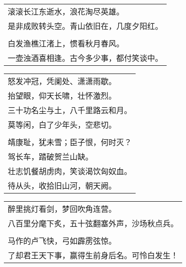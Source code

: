 \noindent\begin{minipage}{\linewidth}
  \vskip-3pt\begin{table}[H]
    \centering
    \begin{tabular}{@{}l@{}}
滚滚长江东逝水，浪花淘尽英雄。\\
是非成败转头空。青山依旧在，几度夕阳红。\\
\\
白发渔樵江渚上，惯看秋月春风。\\
一壶浊酒喜相逢。古今多少事，都付笑谈中。
    \end{tabular}
  \end{table}
\end{minipage}
\vspace{1cm}


\noindent\begin{minipage}{\linewidth}
  \vskip-3pt\begin{table}[H]
    \centering
    \begin{tabular}{@{}l@{}}
怒发冲冠，凭阑处、潇潇雨歇。\\
抬望眼，仰天长啸，壮怀激烈。\\
三十功名尘与土，八千里路云和月。\\
莫等闲，白了少年头，空悲切。\\
\\
靖康耻，犹未雪；臣子恨，何时灭？\\
驾长车，踏破贺兰山缺。\\
壮志饥餐胡虏肉，笑谈渴饮匈奴血。\\
待从头，收拾旧山河，朝天阙。
    \end{tabular}
  \end{table}
\end{minipage}
\vspace{1cm}


\noindent\begin{minipage}{\linewidth}
  \vskip-3pt\begin{table}[H]
    \centering
    \begin{tabular}{@{}l@{}}
醉里挑灯看剑，梦回吹角连营。\\
八百里分麾下炙，五十弦翻塞外声，沙场秋点兵。\\
\\
马作的卢飞快，弓如霹雳弦惊。\\
了却君王天下事，赢得生前身后名。可怜白发生！
    \end{tabular}
  \end{table}
\end{minipage}
\vspace{1cm}


